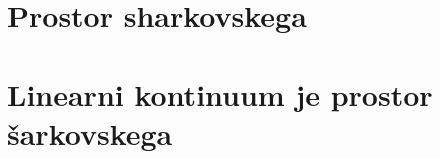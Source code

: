 \documentclass[mat2]{fmfdelo}
\begin{document}
\section{Prostor sharkovskega}

\section{Linearni kontinuum je prostor šarkovskega}






\cleardoublepage                           %

\cleardoublepage                           %
\printindex
\end{document}
